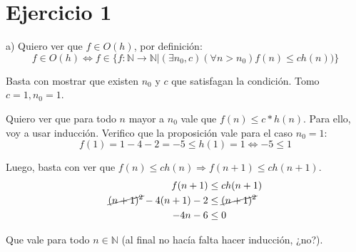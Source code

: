 \documentclass[11pt, spanish]{article}
\begin{document}
\section*{Ejercicio 1}


\vspace{1em}
a) Quiero ver que $f \in O(h)$, por definición:
\[
f \in  O(h) \iff f \in \{f : \mathbb{N} \to \mathbb{N} | (\exists n_0, c)(\forall n > n_0) f(n) \leq ch(n)) \}
\] 

Basta con mostrar que existen $n_0$ y $c$ que satisfagan la condición. Tomo $c=1, n_0=1$.

Quiero ver que para todo $n$ mayor a $n_0$ vale que $f(n) \leq c*h(n)$. Para ello, voy a usar inducción. Verifico que la proposición vale para el caso $n_0=1$:
\[ 
f(1) = 1 - 4 - 2 = -5 \leq h(1) = 1 \iff -5 \leq 1
\]

Luego, basta con ver que $f(n) \leq ch(n) \Rightarrow f(n+1) \leq ch(n+1)$.
\begin{equation*}\begin{split}
f(n+1) &\leq ch(n+1)\\
\cancel{(n+1)^2} - 4(n+1) - 2 &\leq \cancel{(n+1)^2}\\
-4n - 6 &\leq 0
\end{split}\end{equation*}

Que vale para todo $n \in \mathbb{N}$ (al final no hacía falta hacer inducción, ¿no?).
\end{document}
